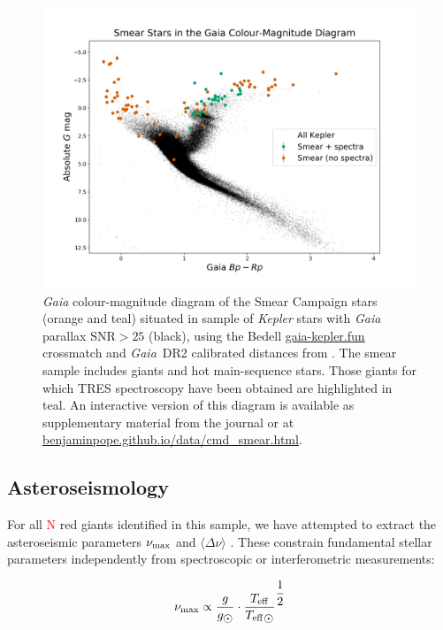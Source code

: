 \documentclass[a4paper,fleqn,usenatbib]{mnras}
\newcommand{\numax}{\mbox{$\nu_{\rm max}$}\xspace}
\newcommand{\Dnu}{\mbox{$\Delta \nu$}\xspace}
\newcommand{\teff}{\mbox{$T_{\rm eff}$}\xspace}
\newcommand{\kepler}{\emph{Kepler}\xspace}
\newcommand{\gaia}{\emph{Gaia}\xspace}
\begin{document}
\begin{figure}
\noindent\includegraphics[width=15cm,keepaspectratio]{gaia_kepler_hr.png}

\caption{\label{hrdiagram}
\gaia colour-magnitude diagram of the Smear Campaign stars (orange and teal) situated in sample of \kepler stars with \gaia parallax $\text{SNR} > 25$ (black), using the Bedell \url{gaia-kepler.fun} crossmatch and \gaia~DR2 calibrated distances from \citet{gaiadists}. The smear sample includes giants and hot main-sequence stars. Those giants for which TRES spectroscopy have been obtained are highlighted in teal. An interactive version of this diagram is available as supplementary material from the journal or at \url{benjaminpope.github.io/data/cmd_smear.html}.}
\end{figure}




\subsection{Asteroseismology}
\label{asteroseismology}

For all \textcolor{red}{N} red giants identified in this sample, we have attempted to extract the asteroseismic parameters \numax and $\langle \Dnu \rangle$ \citep{KB95,2013ARA&A..51..353C}. These constrain fundamental stellar parameters independently from spectroscopic or interferometric measurements: 

\begin{equation}
\label{scaling}
\numax \propto \dfrac{g}{g_{\sun}} \cdot \dfrac{\teff}{\teff_{\sun}}^{\dfrac{1}{2}}
\end{equation}
\end{document}
